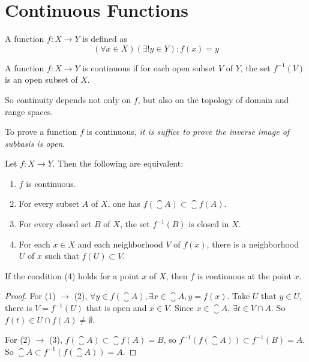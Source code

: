 \section{Continuous Functions}

\begin{definition}
    A function $f: X \rightarrow Y$ is defined as
    \begin{equation}
        (\forall x \in X) (\exists ! y \in Y): f(x) = y
    \end{equation}    
\end{definition}


\begin{definition}
    A function $f: X \rightarrow Y$ is continuous if for each open subset $V$ of $Y$, the set $f^{-1}(V)$ is an open subset of $X$.
    
    So continuity depends not only on $f$, but also on the topology of domain and range spaces.
\end{definition}

To prove a function $f$ is continuous, \emph{it is suffice to prove the inverse image of subbasis is open}.

\begin{theorem}
Let $f: X \rightarrow Y$. Then the following are equivalent:
\begin{enumerate}
    \item $f$ is continuous.
    \item For every subset $A$ of $X$, one has $f(\closure{A}) \subset \closure{f(A)}$.
    \item For every closed set $B$ of $X$, the set $f^{-1}(B)$ is closed in $X$.
    \item For each $x\in X$ and each neighborhood $V$ of $f(x)$, there is a neighborhood $U$ of $x$ such that $f(U) \subset V$.
\end{enumerate}    

If the condition (4) holds for a point $x$ of $X$, then $f$ is continuous at the point $x$.
\end{theorem}
\begin{proof}
    For (1) $\rightarrow$ (2), $\forall y \in f(\closure{A}), \exists x \in \closure{A}, y = f(x)$. Take $U$ that $y \in U$, there is $V = f^{-1}(U)$ that is open and $x \in V$. Since $x \in \closure{A}$, $\exists t \in V \cap A$. So $f(t) \in U \cap f(A) \neq \emptyset$.
    
    For (2) $\rightarrow$ (3), $f(\closure{A}) \subset \closure{f(A)} = B$, so $f^{-1} \left(f(\closure{A}) \right) \subset f^{-1}(B) = A$. So $\closure{A} \subset f^{-1} \left(f(\closure{A}) \right) = A$.
\end{proof}



